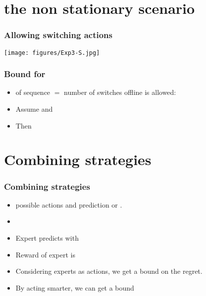 \documentclass{beamer}
\begin{document}
\section{the non stationary scenario}

\begin{frame}
\frametitle{Allowing switching actions}
\texttt{[image: figures/Exp3-S.jpg]}
\end{frame}

\begin{frame}
\frametitle{Bound for }
\begin{itemize}
\item {} of sequence $=$ number of switches offline is allowed:
\item  Assume  and
\item Then

\end{itemize}
\end{frame}

\section{Combining strategies}

\begin{frame}
\frametitle{Combining strategies}
\begin{itemize}
\item {} possible actions and  prediction  or .

\item {}
\item Expert  predicts with  
\item Reward of expert  is 
\item Considering experts as actions, we get a bound 
 on the regret.
\item By acting smarter, we can get a bound 
\end{itemize}
\end{frame}
\end{document}
